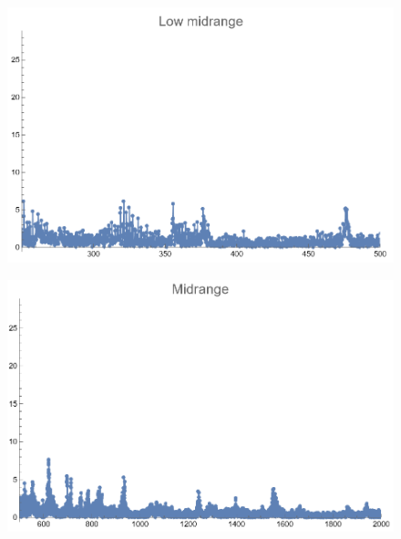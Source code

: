 \documentclass[12pt, letterpaper]{article}
\begin{document}
\begin{figure}[H]
  \centering
  \begin{minipage}{.5\textwidth}
    \centering
    \includegraphics[width=.9\linewidth]{imgs/Cancion6/lowmid.png}
    \label{fig:06d}
  \end{minipage}%
  \begin{minipage}{.5\textwidth}
    \centering
    \includegraphics[width=.9\linewidth]{imgs/Cancion6/mid.png}
    \label{fig:06e}
  \end{minipage}
\end{figure}
\end{document}
